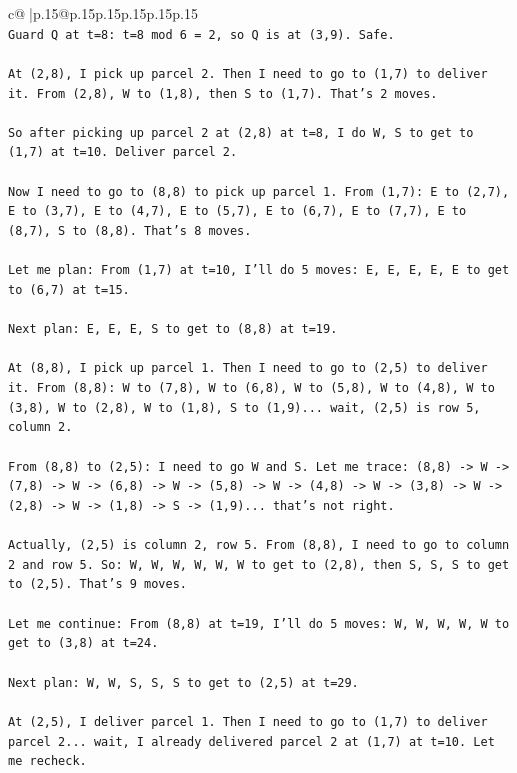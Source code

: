 \documentclass{article}
\begin{document}
{\begin{supertabular}{c@{$\;$}|p{.15\linewidth}@{}p{.15\linewidth}p{.15\linewidth}p{.15\linewidth}p{.15\linewidth}p{.15\linewidth}}
{{{\\ 
\texttt{Guard Q at t=8: t=8 mod 6 = 2, so Q is at (3,9). Safe.} \\
\\ 
\texttt{At (2,8), I pick up parcel 2. Then I need to go to (1,7) to deliver it. From (2,8), W to (1,8), then S to (1,7). That's 2 moves.} \\
\\ 
\texttt{So after picking up parcel 2 at (2,8) at t=8, I do W, S to get to (1,7) at t=10. Deliver parcel 2.} \\
\\ 
\texttt{Now I need to go to (8,8) to pick up parcel 1. From (1,7): E to (2,7), E to (3,7), E to (4,7), E to (5,7), E to (6,7), E to (7,7), E to (8,7), S to (8,8). That's 8 moves.} \\
\\ 
\texttt{Let me plan: From (1,7) at t=10, I'll do 5 moves: E, E, E, E, E to get to (6,7) at t=15.} \\
\\ 
\texttt{Next plan: E, E, E, S to get to (8,8) at t=19.} \\
\\ 
\texttt{At (8,8), I pick up parcel 1. Then I need to go to (2,5) to deliver it. From (8,8): W to (7,8), W to (6,8), W to (5,8), W to (4,8), W to (3,8), W to (2,8), W to (1,8), S to (1,9)... wait, (2,5) is row 5, column 2.} \\
\\ 
\texttt{From (8,8) to (2,5): I need to go W and S. Let me trace: (8,8) {-}> W {-}> (7,8) {-}> W {-}> (6,8) {-}> W {-}> (5,8) {-}> W {-}> (4,8) {-}> W {-}> (3,8) {-}> W {-}> (2,8) {-}> W {-}> (1,8) {-}> S {-}> (1,9)... that's not right.} \\
\\ 
\texttt{Actually, (2,5) is column 2, row 5. From (8,8), I need to go to column 2 and row 5. So: W, W, W, W, W, W to get to (2,8), then S, S, S to get to (2,5). That's 9 moves.} \\
\\ 
\texttt{Let me continue: From (8,8) at t=19, I'll do 5 moves: W, W, W, W, W to get to (3,8) at t=24.} \\
\\ 
\texttt{Next plan: W, W, S, S, S to get to (2,5) at t=29.} \\
\\ 
\texttt{At (2,5), I deliver parcel 1. Then I need to go to (1,7) to deliver parcel 2... wait, I already delivered parcel 2 at (1,7) at t=10. Let me recheck.} \\
}}}
\end{supertabular}}
\end{document}

